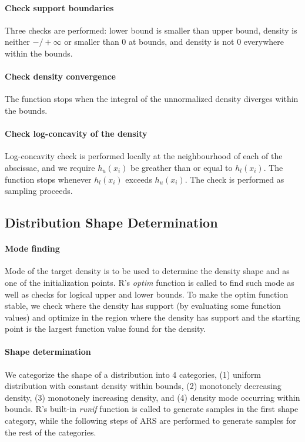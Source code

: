 \documentclass{article}\usepackage[]{graphicx}\usepackage[]{color}
\begin{document}
\paragraph{Check support boundaries}
Three checks are performed: lower bound is smaller than upper bound, 
density is neither $-/+ \infty$ or smaller than 0 at bounds, and density is not
0 everywhere within the bounds.
\paragraph{Check density convergence}
The function stops when the integral of the unnormalized density diverges within 
the bounds.
\paragraph{Check log-concavity of the density}
Log-concavity check is performed locally at the neighbourhood of each of the 
abscissae, and we require $h_u(x_i)$ be greather than or equal to $h_l(x_i)$. 
The function stops whenever $h_l(x_i)$ exceeds $h_u(x_i)$. The
check is performed as sampling proceeds.

\subsection{Distribution Shape Determination}
\paragraph{Mode finding}
Mode of the target density is to be used to determine the density shape and as
one of the initialization points. R's \textit{optim} function is called
to find such mode as well as checks for logical upper and lower bounds. To make the optim function stable, we check where the density has support (by evaluating some function values) and optimize in the region where the density has support and the starting point is the largest function value found for the density.
\paragraph{Shape determination}
We categorize the shape of a distribution into 4 categories, (1) uniform distribution
with constant density within bounds, (2) monotonely decreasing density, (3) monotonely
increasing density, and (4) density mode occurring within bounds. R's built-in
\textit{runif} function is called to generate samples in the first shape category, while
the following steps of ARS are performed to generate samples for the rest of
the categories.
\end{document}
